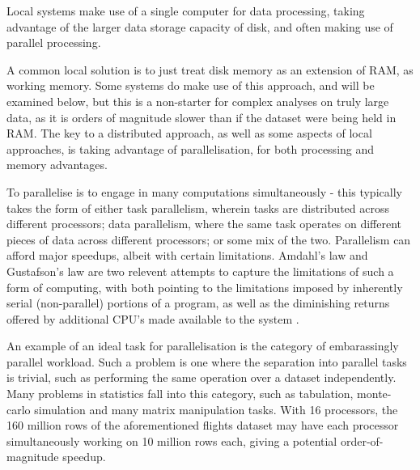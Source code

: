 Local systems make use of a single computer for data processing, taking advantage of the larger data storage capacity of disk, and often making use of parallel processing.

A common local solution is to just treat disk memory as an extension of RAM, as working memory.
Some systems do make use of this approach, and will be examined below, but this is a non-starter for complex analyses on truly large data, as it is orders of magnitude slower than if the dataset were being held in RAM\cite{alpern1994memhierarchy}.
The key to a distributed approach, as well as some aspects of local approaches, is taking advantage of parallelisation, for both processing and memory advantages.

To parallelise is to engage in many computations simultaneously - this typically takes the form of either task parallelism, wherein tasks are distributed across different processors; data parallelism, where the same task operates on different pieces of data across different processors; or some mix of the two\cite{subhlok1993exploiting}.
Parallelism can afford major speedups, albeit with certain limitations.
Amdahl's law and Gustafson's law are two relevent attempts to capture the limitations of such a form of computing, with both pointing to the limitations imposed by inherently serial (non-parallel) portions of a program, as well as the diminishing returns offered by additional CPU's made available to the system \cite{amdahl1967law}\cite{gustafson1988law}.

An example of an ideal task for parallelisation is the category of embarassingly parallel workload.
Such a problem is one where the separation into parallel tasks is trivial, such as performing the same operation over a dataset independently\cite{foster1995parallel}.
Many problems in statistics fall into this category, such as tabulation, monte-carlo simulation and many matrix manipulation tasks.
With 16 processors, the 160 million rows of the aforementioned flights dataset may have each processor simultaneously working on 10 million rows each, giving a potential order-of-magnitude speedup.

